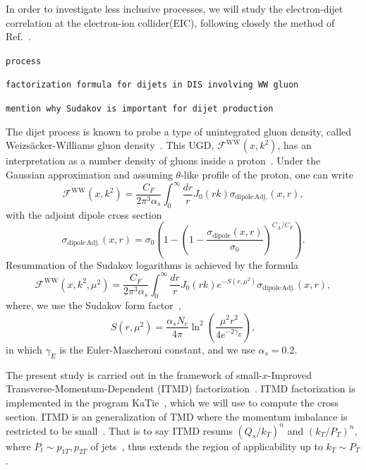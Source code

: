 \documentclass[11pt]{article}
\numberwithin{equation}{section}
\numberwithin{table}{section}
\numberwithin{figure}{section}
\newcommand{\fww}[0]{\mathcal{F}^{\mathrm{WW}}}
\newcommand{\sdp}[0]{\sigma_{\mathrm{dipole}}}
\newcommand{\sdpa}[0]{\sigma_{\mathrm{dipole\,Adj.}}}
\newcommand{\comment}[1]{\texttt{\color{red}#1}}
\begin{document}
In order to investigate less inclusive processes, we will study the electron-dijet correlation at the electron-ion collider(EIC), following closely the method of Ref.~\cite{vanHameren:2021sqc}. 

\comment{process}

\comment{factorization formula for dijets in DIS involving WW gluon}

\comment{mention why Sudakov is important for dijet production}

The dijet process is known to probe a type of unintegrated gluon density, called Weizs\"acker-Williams gluon density~\cite{Dominguez:2010xd,Dominguez:2011wm,Xiao:2017ggh}.
This UGD, $\fww(x,k^2)$, has an interpretation as a number density of gluons inside a proton~\cite{Dominguez:2010xd,Dominguez:2011wm,Dominguez:2011wm}. Under the Gaussian approximation and assuming $\theta$-like profile of the proton, one can write~\cite{vanHameren:2016ftb,Xiao:2017ggh,Dominguez:2010xd,Dominguez:2011wm}
\begin{equation}
\fww(x,k^2)= \frac{C_F}{2\pi^3\alpha_s}\int^\infty_0\frac{dr}{r}J_0(r k) \sdpa(x,r),
\end{equation} 	
with the adjoint dipole cross section
\begin{equation}
\sdpa(x,r)=\sigma_0\left( 1-\left(1-\frac{\sdp(x,r)}{\sigma_0}\right)^{C_A/C_F}\right).
\label{eq:ww}
\end{equation}
Resummation of the Sudakov logarithms is achieved by the formula~\cite{Mueller:2013wwa,Xiao:2017yya}
\begin{equation}
	\fww(x,k^2,\mu^2)= \frac{C_F}{2\pi^3\alpha_s}\int^\infty_0\frac{dr}{r}J_0(r k) e^{-S(r,\mu^2)} \sdpa(x,r),
	\label{eq:ww-sud}
\end{equation}
where, we use the Sudakov form factor~\cite{Mueller:2013wwa,Xiao:2017yya},
\begin{equation}
	S(r,\mu^2)=\frac{\alpha_s N_c}{4\pi}\ln^2\left(\frac{\mu^2r^2}{4e^{-2\gamma_E}}\right),
\end{equation}
in which $\gamma_E$ is the Euler-Mascheroni constant, and we use $\alpha_s=0.2$. 
 

  
The present study is carried out in the framework of small-$x$-Improved Transverse-Momentum-Dependent (ITMD) factorization~\cite{Kotko:2015ura,vanHameren:2016ftb}.
ITMD factorization is implemented in the program KaTie~\cite{vanHameren:2016kkz}, which we will use to compute the cross section. 
ITMD is an generalization of TMD where the momentum imbalance is restricted to be small~\cite{Kotko:2015ura,vanHameren:2016ftb}. That is to say ITMD resums $(Q_s/k_T)^n$ and $(k_T/P_T)^n$, where $P_t\sim p_{1T},p_{2T}$ of jets~\cite{Kotko:2015ura,vanHameren:2016ftb}, thus extends the region of applicability up to $k_T\sim P_T$.
\end{document}
